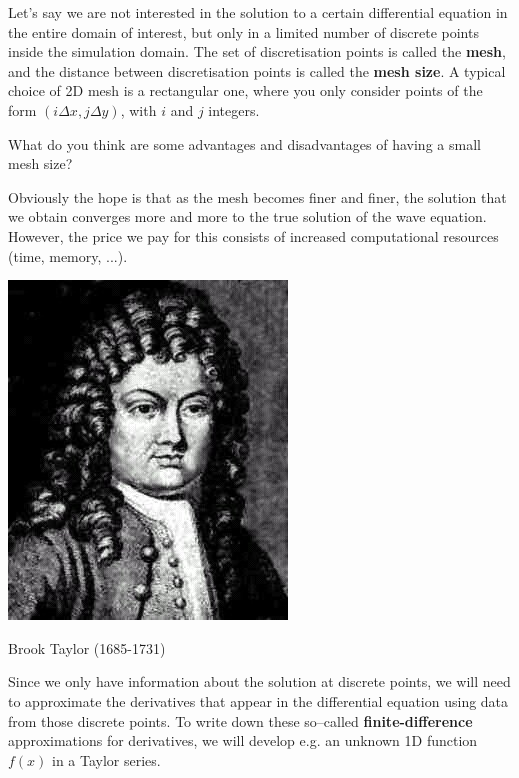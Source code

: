 \pagebreak


Let's say we are not interested in the solution to a certain differential equation in the entire domain of interest, but only in a limited number of discrete points inside the simulation domain. The set of discretisation points is called the \textbf{mesh}, and the distance between discretisation points is called the \textbf{mesh size}. A typical choice of 2D mesh is a rectangular one, where you only consider points of the form $(i \Delta x, j \Delta y)$, with $i$ and $j$ integers.

\begin{cue}
What do you think are some advantages and disadvantages of having a small mesh size?  
\end{cue}

Obviously the hope is that as the mesh becomes finer and finer, the solution that we obtain converges more and more to the true solution of the wave equation. However, the price we pay for this consists of increased computational resources (time, memory, ...).

\begin{marginfigure}[-2.0cm]
  \includegraphics{numeric/figures/b_taylor}
  \caption{Brook Taylor (1685-1731)}
\end{marginfigure}

Since we only have information about the solution at discrete points, we will need to approximate the derivatives that appear in the differential equation using data from those discrete points. To write down these so--called \textbf{finite-difference} approximations for derivatives, we will develop e.g. an unknown 1D function $f(x)$ in a Taylor series.

